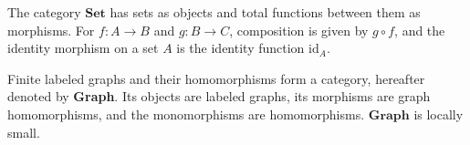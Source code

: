 \begin{example}
The category \(\mathbf{Set}\) has sets as objects and total functions between them as morphisms. For \(f\colon A\to B\) and \(g\colon B\to C\), composition is given by \(g\circ f\), and the identity morphism on a set \(A\) is the identity function \(\mathrm{id}_A\).
\end{example}

\begin{example} 
    Finite labeled graphs and their homomorphisms form a category, hereafter denoted by \textbf{Graph}. Its objects are labeled graphs, its morphisms are graph homomorphisms, and the monomorphisms are homomorphisms. 
    $\textbf{Graph}$ is locally small. 
\end{example}

 
